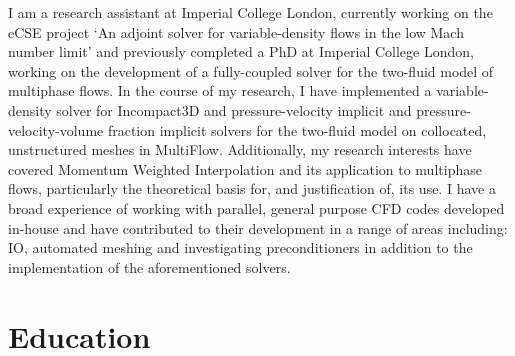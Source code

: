 \documentclass[10pt,a4paper]{moderncv} %
\begin{document}
\makecvtitle %
\vspace{-0.6cm}


I am a research assistant at Imperial College London, currently working on the eCSE project `An
adjoint solver for variable-density flows in the low Mach number limit' and previously completed a
PhD at Imperial College London, working on the development of a fully-coupled solver for the
two-fluid model of multiphase flows.
In the course of my research, I have implemented a variable-density solver for Incompact3D and
pressure-velocity implicit and pressure-velocity-volume fraction implicit solvers for the two-fluid
model on collocated, unstructured meshes in MultiFlow.
Additionally, my research interests have covered Momentum Weighted Interpolation and its application
to multiphase flows, particularly the theoretical basis for, and justification of, its use.
I have a broad experience of working with parallel, general purpose CFD codes developed in-house
and have contributed to their development in a range of areas including: IO, automated meshing and
investigating preconditioners in addition to the implementation of the aforementioned solvers.
\\


\section{Education}

\end{document}
